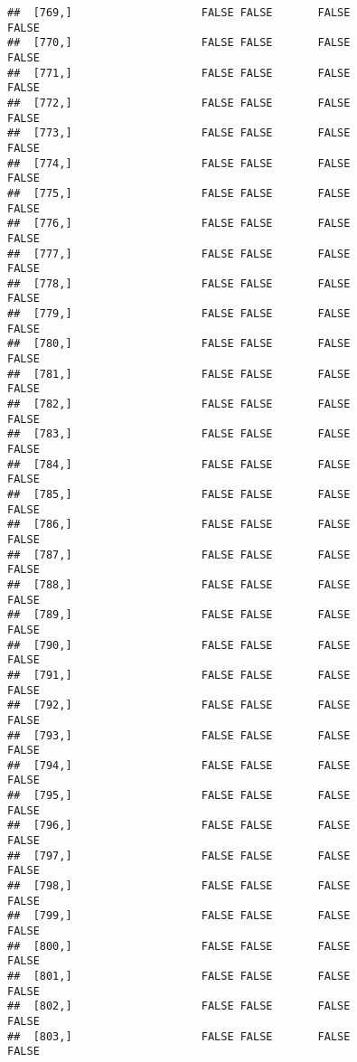 \documentclass[
]{article}
\begin{document}
\begin{verbatim}
##  [769,]                    FALSE FALSE       FALSE                FALSE
##  [770,]                    FALSE FALSE       FALSE                FALSE
##  [771,]                    FALSE FALSE       FALSE                FALSE
##  [772,]                    FALSE FALSE       FALSE                FALSE
##  [773,]                    FALSE FALSE       FALSE                FALSE
##  [774,]                    FALSE FALSE       FALSE                FALSE
##  [775,]                    FALSE FALSE       FALSE                FALSE
##  [776,]                    FALSE FALSE       FALSE                FALSE
##  [777,]                    FALSE FALSE       FALSE                FALSE
##  [778,]                    FALSE FALSE       FALSE                FALSE
##  [779,]                    FALSE FALSE       FALSE                FALSE
##  [780,]                    FALSE FALSE       FALSE                FALSE
##  [781,]                    FALSE FALSE       FALSE                FALSE
##  [782,]                    FALSE FALSE       FALSE                FALSE
##  [783,]                    FALSE FALSE       FALSE                FALSE
##  [784,]                    FALSE FALSE       FALSE                FALSE
##  [785,]                    FALSE FALSE       FALSE                FALSE
##  [786,]                    FALSE FALSE       FALSE                FALSE
##  [787,]                    FALSE FALSE       FALSE                FALSE
##  [788,]                    FALSE FALSE       FALSE                FALSE
##  [789,]                    FALSE FALSE       FALSE                FALSE
##  [790,]                    FALSE FALSE       FALSE                FALSE
##  [791,]                    FALSE FALSE       FALSE                FALSE
##  [792,]                    FALSE FALSE       FALSE                FALSE
##  [793,]                    FALSE FALSE       FALSE                FALSE
##  [794,]                    FALSE FALSE       FALSE                FALSE
##  [795,]                    FALSE FALSE       FALSE                FALSE
##  [796,]                    FALSE FALSE       FALSE                FALSE
##  [797,]                    FALSE FALSE       FALSE                FALSE
##  [798,]                    FALSE FALSE       FALSE                FALSE
##  [799,]                    FALSE FALSE       FALSE                FALSE
##  [800,]                    FALSE FALSE       FALSE                FALSE
##  [801,]                    FALSE FALSE       FALSE                FALSE
##  [802,]                    FALSE FALSE       FALSE                FALSE
##  [803,]                    FALSE FALSE       FALSE                FALSE

\end{verbatim}
\end{document}
